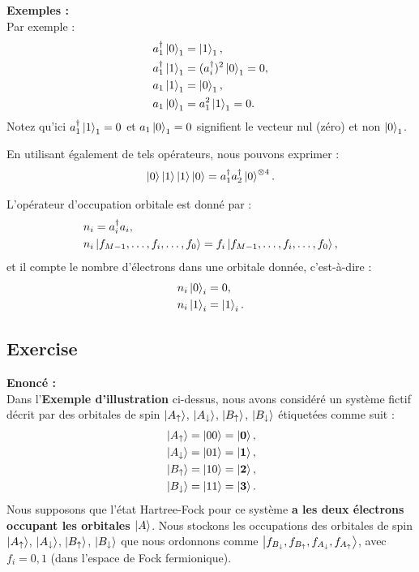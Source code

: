 \documentclass[12pt,a4paper]{article} %
\numberwithin{equation}{section} %
\numberwithin{figure}{section} %
\numberwithin{table}{section} %
\begin{document}
\noindent \textbf{Exemples :} \\
Par exemple :
\begin{align}
\label{eq:fermion_example}
& a^\dagger_1 \ket{0}_1 = \ket{1}_1, \\
& a^\dagger_1 \ket{1}_1 = (a^\dagger_i)^2 \ket{0}_1 = 0, \\
& a_1 \ket{1}_1 = \ket{0}_1, \\
& a_1 \ket{0}_1 = a_1^2 \ket{1}_1 = 0.
\end{align}
Notez qu'ici $a^\dagger_1 \ket{1}_1 = 0$ et $a_1 \ket{0}_1 = 0$ signifient le vecteur nul (zéro) et non $\ket{0}_1$.

En utilisant également de tels opérateurs, nous pouvons exprimer :
\begin{equation}
\label{eq:example_expression}
\ket{0} \ket{1} \ket{1} \ket{0} = a^\dagger_1 a^\dagger_2 \ket{0}^{\otimes 4}.
\end{equation}

L'opérateur d'occupation orbitale est donné par :
\begin{align}
\label{eq:occupation_operator}
& n_i = a^\dagger_i a_i, \\
& n_i \ket{f_{M-1}, \dots, f_i, \dots, f_0} = f_i \ket{f_{M-1}, \dots, f_i, \dots, f_0},
\end{align}
et il compte le nombre d'électrons dans une orbitale donnée, c'est-à-dire :
\begin{align}
\label{eq:occupation_number}
& n_i \ket{0}_i = 0, \\
& n_i \ket{1}_i = \ket{1}_i.
\end{align}

\subsection{Exercise}

\noindent \textbf{Enoncé :} \\
Dans l'\textbf{Exemple d'illustration} ci-dessus, nous avons considéré un système fictif décrit par des orbitales de spin $\ket{A_\uparrow}$, $\ket{A_\downarrow}$, $\ket{B_\uparrow}$, $\ket{B_\downarrow}$ étiquetées comme suit :
\begin{align}
\label{eq:spin_orbitals}
& \ket{A_\uparrow} = \ket{00} = \ket{\mathbf{0}}, \\
& \ket{A_\downarrow} = \ket{01} = \ket{\mathbf{1}}, \\
& \ket{B_\uparrow} = \ket{10} = \ket{\mathbf{2}}, \\
& \ket{B_\downarrow} = \ket{11} = \ket{\mathbf{3}}.
\end{align}
Nous supposons que l'état Hartree-Fock pour ce système \textbf{a les deux électrons occupant les orbitales $\ket{A}$}. Nous stockons les occupations des orbitales de spin $\ket{A_\uparrow}$, $\ket{A_\downarrow}$, $\ket{B_\uparrow}$, $\ket{B_\downarrow}$ que nous ordonnons comme $\ket{f_{B_\downarrow}, f_{B_\uparrow}, f_{A_\downarrow}, f_{A_\uparrow}}$, avec $f_i = 0, 1$ (dans l'espace de Fock fermionique).
\end{document}
